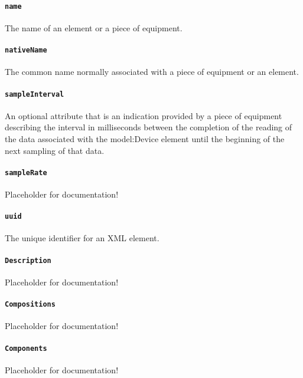 \paragraph{\texttt{name}}\mbox{}
\newline\tab The name of an element or a piece of equipment.

\paragraph{\texttt{nativeName}}\mbox{}
\newline\tab The common name normally associated with a piece of equipment or an element.

\paragraph{\texttt{sampleInterval}}\mbox{}
\newline\tab An optional attribute that is an indication provided by a piece of equipment describing the interval in milliseconds between the completion of the reading of the data associated with the {model:Device} element until the beginning of the next sampling of that data.

\paragraph{\texttt{sampleRate}}\mbox{}
\newline\tab Placeholder for documentation!

\paragraph{\texttt{uuid}}\mbox{}
\newline\tab The unique identifier for an XML element.

\paragraph{\texttt{Description}}\mbox{}
\newline\tab Placeholder for documentation!

\paragraph{\texttt{Compositions}}\mbox{}
\newline\tab Placeholder for documentation!

\paragraph{\texttt{Components}}\mbox{}
\newline\tab Placeholder for documentation!

